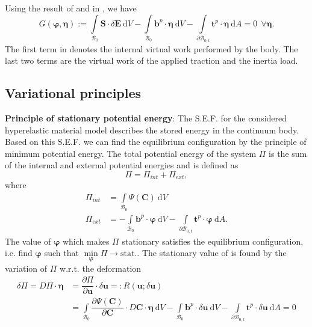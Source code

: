 Using the result of  and  in , we have
\begin{equation}
G(\bm{\varphi},\bm{\eta}):= \int\limits_{\mathcal{B}_0} \mathbf{S} \cdot \delta \mathbf{E} \ \mathrm{d}V - \int\limits_{\mathcal{B}_0} \mathbf{b}^p \cdot \bm{\eta} \ \mathrm{d}V - \int\limits_{\mathcal{\partial B}_{0,t}} \mathbf{t}^p \cdot \bm{\eta} \ \mathrm{d}A = 0 \ \ \forall \bm{\eta}.
\label{eq:2.11}
\end{equation}
The first term in  denotes the internal virtual work performed by the body. The last two terms are the virtual work of the applied traction and the inertia load.

\subsection{Variational principles}
\textbf{Principle of stationary potential energy}: The S.E.F. for the considered hyperelastic material model describes the stored energy in the continuum body. Based on this S.E.F. we can find the equilibrium configuration by the principle of minimum potential energy. The total potential energy of the system $\Pi$ is the sum of the internal and external potential energies and is defined as 
\begin{equation}
\Pi = \Pi_{int} + \Pi_{ext},
\label{eq:2.12}
\end{equation}
where 
\begin{align}
\Pi_{int} &= \int\limits_{\mathcal{B}_0} \Psi (\mathbf{C}) \ \mathrm{d}V \\
\Pi_{ext} &= - \int\limits_{\mathcal{B}_0} \mathbf{b}^p \cdot \bm{\varphi} \ \mathrm{d}V - \int\limits_{\mathcal{\partial B}_{0,t}} \mathbf{t}^p \cdot \bm{\varphi} \ \mathrm{d}A.
\end{align}
The value of $\bm{\varphi}$ which makes $\Pi$ stationary satisfies the equilibrium configuration, i.e. find $\bm{\varphi}$ such that $\min\limits_{\bm{\varphi}} \Pi \to \text{stat.}$. The stationary value of  is found by the variation of $\Pi$ w.r.t. the deformation
\begin{align}
\delta \Pi = D \Pi \cdot \bm{\eta} &= \dfrac{\partial \Pi}{\partial \mathbf{u}} \cdot \delta \mathbf{u} =: R(\mathbf{u}; \delta \mathbf{u})\nonumber \\
&= \int\limits_{\mathcal{B}_0} \dfrac{\partial \Psi (\mathbf{C})}{\partial \mathbf{C}} \cdot D \mathbf{C} \cdot \bm{\eta} \ \mathrm{d}V - \int\limits_{\mathcal{B}_0} \mathbf{b}^p \cdot \delta \mathbf{u} \ \mathrm{d}V - \int\limits_{\mathcal{\partial B}_{0,t}} \mathbf{t}^p \cdot \delta \mathbf{u} \ \mathrm{d}A = 0
\end{align}
